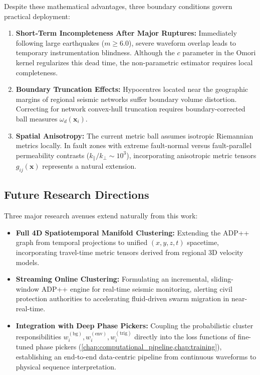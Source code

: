 Despite these mathematical advantages, three boundary conditions
govern practical deployment:
\begin{enumerate}[noitemsep,topsep=2pt]
  \item \textbf{Short-Term Incompleteness After Major Ruptures:}
    Immediately following large earthquakes ($m \ge 6.0$), severe
    waveform overlap leads to temporary instrumentation blindness.
    Although the $c$ parameter in the Omori kernel regularizes this
    dead time, the non-parametric \pak{} estimator requires local completeness.
  \item \textbf{Boundary Truncation Effects:} Hypocentres located
    near the geographic margins of regional seismic networks suffer
    boundary volume distortion. Correcting for network convex-hull
    truncation requires boundary-corrected ball measures
    $\omega_d(\mathbf{x}_i)$.
  \item \textbf{Spatial Anisotropy:} The current \pak{} metric ball
    assumes isotropic Riemannian metrics locally. In fault zones
    with extreme fault-normal versus fault-parallel permeability
    contrasts ($k_\parallel / k_\perp \sim 10^3$), incorporating
    anisotropic metric tensors $g_{ij}(\mathbf{x})$ represents a
    natural extension.
\end{enumerate}

\subsection{Future Research Directions}
\label{subsec:discussion_future}

Three major research avenues extend naturally from this work:
\begin{itemize}[noitemsep,topsep=2pt]
  \item \textbf{Full 4D Spatiotemporal Manifold Clustering:}
    Extending the \textsc{ADP++} graph from temporal projections to
    unified $(x, y, z, t)$ spacetime, incorporating travel-time
    metric tensors derived from regional 3D velocity models.
  \item \textbf{Streaming Online Clustering:} Formulating an
    incremental, sliding-window \textsc{ADP++} engine for real-time
    seismic monitoring, alerting civil protection authorities to
    accelerating fluid-driven swarm migration in near-real-time.
  \item \textbf{Integration with Deep Phase Pickers:} Coupling the
    probabilistic cluster responsibilities $w_i^{(\mathrm{bg})},
    w_i^{(\mathrm{env})}, w_i^{(\mathrm{trig})}$ directly into the
    loss functions of fine-tuned phase pickers
    (\cref{chap:computational_pipeline,chap:training}), establishing
    an end-to-end data-centric
    pipeline from continuous waveforms to physical sequence interpretation.
\end{itemize}
